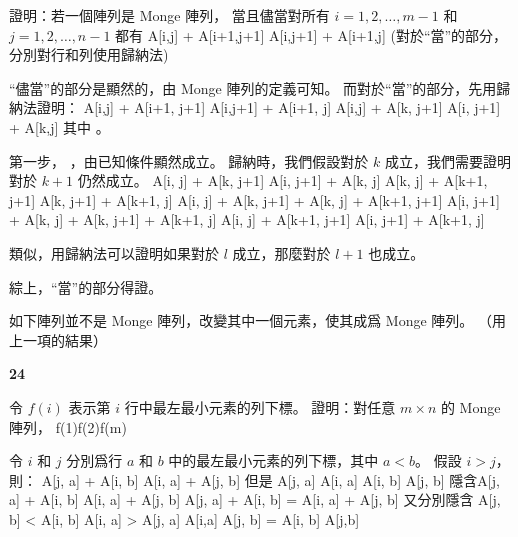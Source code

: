 \startigBase[a]
\startitem 證明：若一個陣列是 Monge 陣列，
當且儘當對所有 $i=1,2,\ldots,m-1$ 和 $j = 1,2,\ldots,n-1$ 都有
\startformula
A[i,j] + A[i+1,j+1] \le A[i,j+1] + A[i+1,j]
\stopformula
(\hint 對於“當”的部分，分別對行和列使用歸納法)
\stopitem

\startANSWER
“儘當”的部分是顯然的，由 Monge 陣列的定義可知。
而對於“當”的部分，先用歸納法證明：
\startsplitformula\startmathalignment[n=1]
\NC A[i,j] + A[i+1, j+1] \le A[i,j+1] + A[i+1, j] \NR
\NC \Downarrow \NR
\NC A[i,j] + A[k, j+1] \le A[i, j+1] + A[k,j] \NR
\stopmathalignment\stopsplitformula
其中 。

第一步， ，由已知條件顯然成立。
歸納時，我們假設對於 $k$ 成立，我們需要證明對於 $k+1$ 仍然成立。
\startsplitformula\startmathalignment[n=1]
\NC A[i, j] + A[k, j+1] \le A[i, j+1] + A[k, j]  \NR
\NC A[k, j] + A[k+1, j+1] \le A[k, j+1] + A[k+1, j]  \NR
\NC \Downarrow \NR
\NC A[i, j] + A[k, j+1] + A[k, j] + A[k+1, j+1] \le A[i, j+1] + A[k, j] + A[k, j+1] + A[k+1, j] \NR
\NC \Downarrow \NR
\NC A[i, j] + A[k+1, j+1] \le A[i, j+1] + A[k+1, j] \NR
\stopmathalignment\stopsplitformula

類似，用歸納法可以證明如果對於 $l$ 成立，那麼對於 $l+1$ 也成立。

綜上，“當”的部分得證。
\stopANSWER

\startitem
如下陣列並不是 Monge 陣列，改變其中一個元素，使其成爲 Monge 陣列。
（\hint 用上一項的結果）
\startsplitformula\startmatrix
{}    \NR
{}    \NR
{}    \NR
{}    \NR
{}    \NR
\stopmatrix\stopsplitformula
\stopitem

\startANSWER
\startsplitformula\startmatrix
{}  \NC \bf 24  \NR
{}    \NR
{}    \NR
{}    \NR
{}    \NR
\stopmatrix\stopsplitformula
\stopANSWER

\item 令 $f(i)$ 表示第 $i$ 行中最左最小元素的列下標。
證明：對任意 $m\times n$ 的 Monge 陣列，
\startformula
f(1)\le f(2)\le\cdots\le f(m)
\stopformula

\startANSWER
令 $i$ 和 $j$ 分別爲行 $a$ 和 $b$ 中的最左最小元素的列下標，其中 $a < b$。
假設 $i>j$，則：
\startformula
A[j, a] + A[i, b] \le A[i, a] + A[j, b]
\stopformula
但是
\startsplitformula\startmathalignment
\NC A[j, a] \ge A[i, a] \NC {} \NR
\NC A[i, b] \ge A[j, b] \NC {} \NR
\stopmathalignment\stopsplitformula
隱含\startsplitformula\startmathalignment[n=1]
\NC A[j, a] + A[i, b] \ge A[i, a] + A[j, b] \NR
\NC \Downarrow \NR
\NC A[j, a] + A[i, b] = A[i, a] + A[j, b] \NR
\stopmathalignment\stopsplitformula
又分別隱含\startsplitformula\startmathalignment
\NC A[j, b] < A[i, b] \Rightarrow A[i, a] > A[j, a] \NC \Rightarrow A[i,a]  \NR
\NC A[j, b] = A[i, b] \NC \Rightarrow A[j,b]  \NR
\stopmathalignment\stopsplitformula

